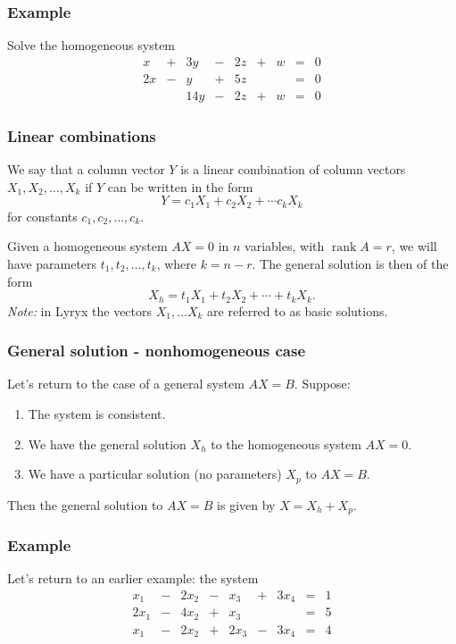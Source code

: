 \documentclass[12pt,t]{beamer}
\DeclareMathOperator{\rank}{rank}
\begin{document}
\begin{frame}\frametitle{Example}
Solve the homogeneous system
\[
\begin{array}{rrrrrrrrr}
x&+&3y&-&2z&+&w &=& 0\\
2x&-&y&+&5z & & &=&0\\
& &14y&-&2z&+&w &=&0
\end{array}
\]
\end{frame}
\begin{frame}\frametitle{Linear combinations}
\begin{definition}
We say that a column vector $Y$ is a \alert{linear combination} of column vectors $X_1, X_2, \ldots, X_k$ if $Y$ can be written in the form
\[
Y = c_1X_1 + c_2X_2 + \cdots c_kX_k
\]
for constants $c_1, c_2, \ldots, c_k$.
\end{definition}
Given a homogeneous system $AX=0$ in $n$ variables, with $\rank A = r$, we will have parameters $t_1, t_2, \ldots, t_k$, where $k=n-r$. The general solution is then of the form
\[
X_h = t_1X_1+t_2X_2+\cdots + t_kX_k.
\]
{\em Note:} in Lyryx the vectors $X_1,\ldots X_k$ are referred to as \alert{basic solutions}.
\end{frame}
\begin{frame}\frametitle{General solution - nonhomogeneous case}
Let's return to the case of a general system $AX=B$. Suppose:
\begin{enumerate}
\item The system is consistent.
\item We have the general solution $X_h$ to the homogeneous system $AX=0$.
\item We have a \alert{particular} solution (no parameters) $X_p$ to $AX=B$.
\end{enumerate}
Then the general solution to $AX=B$ is given by $X=X_h+X_p$.
\end{frame}
\begin{frame}\frametitle{Example}
Let's return to an earlier example: the system
\[
 \begin{array}{rrrrrrrrr}
 x_1 &-& 2x_2 &-& x_3 &+& 3x_4 &=& 1\\
 2x_1&-& 4x_2 &+& x_3 & & &=& 5\\
 x_1 &-& 2x_2 &+& 2x_3 &-& 3x_4 &=& 4
\end{array}
\]
\end{frame}
\end{document}

